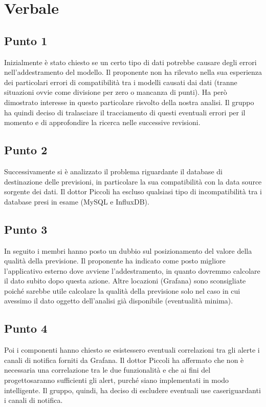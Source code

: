 \section{Verbale}
    \subsection{Punto 1}
        Inizialmente è stato chiesto se un certo tipo di dati potrebbe causare degli errori nell'addestramento del modello. Il proponente non ha rilevato nella sua esperienza dei particolari errori di compatibilità tra i modelli causati dai dati (tranne situazioni ovvie come divisione per zero o mancanza di punti). Ha però dimostrato interesse in questo particolare risvolto della nostra analisi. Il gruppo ha quindi deciso di tralasciare il tracciamento di questi eventuali errori per il momento e di approfondire la ricerca nelle successive revisioni.
    \subsection{Punto 2}
        Successivamente si è analizzato il problema riguardante il database di destinazione delle previsioni, in particolare la sua compatibilità con la data source sorgente dei dati. Il dottor Piccoli ha escluso qualsiasi tipo di incompatibilità tra i database presi in esame (MySQL e InfluxDB). 
    \subsection{Punto 3}
        In seguito i membri hanno posto un dubbio sul posizionamento del valore della qualità della previsione. Il proponente ha indicato come posto migliore l'applicativo esterno dove avviene l'addestramento, in quanto dovremmo calcolare il dato subito dopo questa azione. Altre locazioni (Grafana\glo) sono sconsigliate poiché sarebbe utile calcolare la qualità della previsione solo nel caso in cui avessimo il dato oggetto dell'analisi già disponibile (eventualità minima).
    \subsection{Punto 4}
        Poi i componenti hanno chiesto se esistessero eventuali correlazioni tra gli alert\glosp e i canali di notifica forniti da Grafana\glo. Il dottor Piccoli ha affermato che non è necessaria una correlazione tra le due funzionalità e che ai fini del progetto\glosp saranno sufficienti gli alert\glo, purché siano implementati in modo intelligente. Il gruppo, quindi, ha deciso di escludere eventuali use case\glosp riguardanti i canali di notifica.
